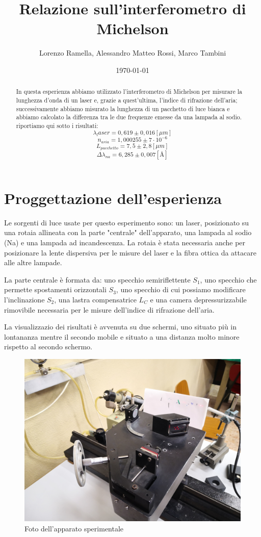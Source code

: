 \documentclass{article}
\title{Relazione sull'interferometro di Michelson}
\author{Lorenzo Ramella, Alessandro Matteo Rossi, Marco Tambini}
\date{\today}
\begin{document}
\maketitle

\begin{abstract}
In questa esperienza abbiamo utilizzato l'interferometro di Michelson per misurare la lunghezza d'onda di un laser e, grazie a quest'ultima, l'indice di rifrazione dell'aria; successivamente abbiamo misurato la lunghezza di un pacchetto di luce bianca e abbiamo calcolato la differenza tra le due frequenze emesse da una lampada al sodio.
riportiamo qui sotto i risultati:
\[ \lambda_laser = 0,619 \pm 0,016 [\mu m] \]
\[ n_{aria} = 1,000255 \pm 7 \cdot 10^{-6} \]
\[ L_{pacchetto} = 7,5 \pm 2,8 [\mu m] \]
\[ \Delta \lambda_{na} = 6,285 \pm 0,007 [\textrm{Å}] \]
\end{abstract}
\tableofcontents



\section{Proggettazione dell'esperienza}
Le sorgenti di luce usate per questo esperimento sono: un laser, posizionato su una rotaia allineata con la parte "centrale" dell'apparato, una lampada al sodio (Na) e una lampada ad incandescenza. La rotaia è stata necessaria anche per posizionare la lente dispersiva per le misure del laser e la fibra ottica da attacare alle altre lampade.

La parte centrale è formata da: uno specchio semiriflettente $S_1$, uno specchio che permette spostamenti orizzontali $S_3$, uno specchio di cui possiamo modificare l'inclinazione $S_2$, una lastra compensatrice $L_C$ e una camera depressurizzabile rimovibile necessaria per le misure dell'indice di rifrazione dell'aria. 

La visualizzazio dei risultati è avvenuta su due schermi, uno situato più in lontananza mentre il secondo mobile e situato a una distanza molto minore rispetto al secondo schermo.


\begin{figure}[h!]
  \centering
  \includegraphics[width=0.5\linewidth]{IM strumentazione}
  \caption{Foto dell'apparato sperimentale}
\end{figure}
\end{document}
